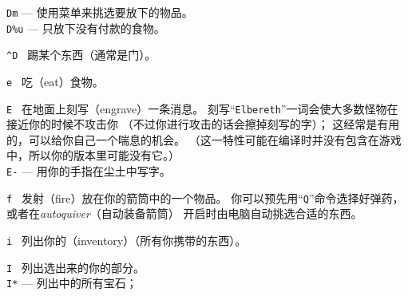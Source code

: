 \documentclass[a4paper, 10pt]{article}
\newcommand{\tb}[1]{\tt #1 \hfill}
\begin{document}
{\tt Dm}  --- 使用菜单来挑选要放下的物品。\\
{\tt D\%u} --- 只放下没有付款的食物。
\item[\tb{\^{}D}]
踢某个东西（通常是门）。
\item[\tb{e}]
吃（eat）食物。
\item[\tb{E}]
在地面上刻写（engrave）一条消息。
刻写“{\tt Elbereth}”一词会使大多数怪物在接近你的时候不攻击你
（不过你进行攻击的话会擦掉刻写的字）；
这经常是有用的，可以给你自己一个喘息的机会。
（这一特性可能在编译时并没有包含在游戏中，所以你的版本里可能没有它。）\\
{\tt E-} --- 用你的手指在尘土中写字。
\item[\tb{f}]
发射（fire）放在你的箭筒中的一个物品。
你可以预先用“{\tt Q}”命令选择好弹药，或者在{\it autoquiver\/}（自动装备箭筒）
开启时由电脑自动挑选合适的东西。
\item[\tb{i}]
列出你的\zhTransInventory（inventory）（所有你携带的东西）。
\item[\tb{I}]
列出选出来的你的部分\zhTransInventory。\\
{\tt I*} --- 列出\zhTransInventory{}中的所有宝石；\\
\end{document}
